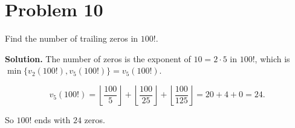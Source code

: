 \section*{Problem 10}

Find the number of trailing zeros in $100!$.

\textbf{Solution.}
The number of zeros is the exponent of $10=2\cdot 5$ in $100!$, which is
$\min\{v_2(100!), v_5(100!)\} = v_5(100!)$.

\[
v_5(100!)=\left\lfloor \frac{100}{5}\right\rfloor
+\left\lfloor \frac{100}{25}\right\rfloor
+\left\lfloor \frac{100}{125}\right\rfloor
=20+4+0=24.
\]

So $100!$ ends with $\boxed{24}$ zeros.
